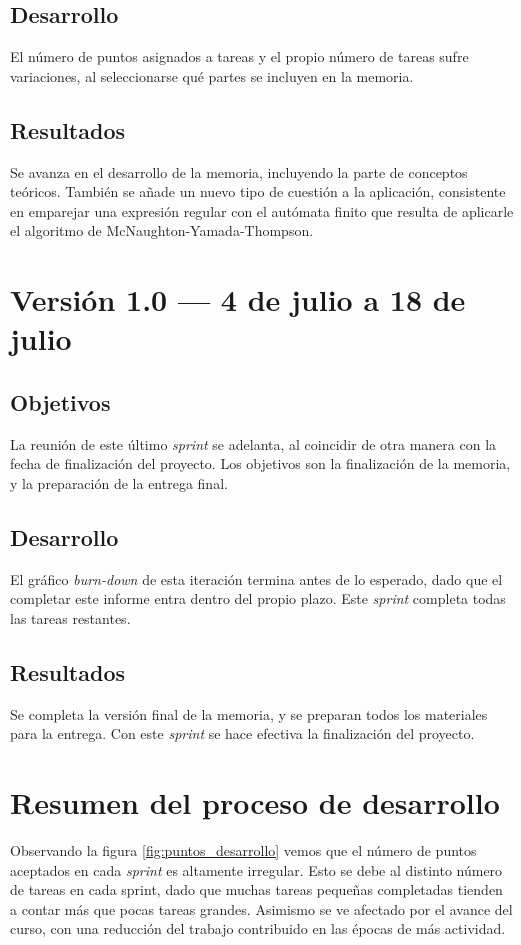 \subsection{Desarrollo}
El número de puntos asignados a tareas y el propio número de tareas sufre variaciones, al seleccionarse qué partes se incluyen en la memoria.


\subsection{Resultados}
Se avanza en el desarrollo de la memoria, incluyendo la parte de conceptos teóricos.
También se añade un nuevo tipo de cuestión a la aplicación, consistente en emparejar una expresión regular con el autómata finito que resulta de aplicarle el algoritmo de McNaughton-Yamada-Thompson.

\section{Versión 1.0 --- 4 de julio a 18 de julio}
\subsection{Objetivos}
La reunión de este último \emph{sprint} se adelanta, al coincidir de otra manera con la fecha de finalización del proyecto.
Los objetivos son la finalización de la memoria, y la preparación de la entrega final.

\subsection{Desarrollo}
El gráfico \emph{burn-down} de esta iteración termina antes de lo esperado, dado que el completar este informe entra dentro del propio plazo.
Este \emph{sprint} completa todas las tareas restantes.


\subsection{Resultados}
Se completa la versión final de la memoria, y se preparan todos los materiales para la entrega.
Con este \emph{sprint} se hace efectiva la finalización del proyecto.

\section{Resumen del proceso de desarrollo}
Observando la figura \ref{fig:puntos_desarrollo} vemos que el número de puntos aceptados en cada \emph{sprint} es altamente irregular.
Esto se debe al distinto número de tareas en cada sprint, dado que muchas tareas pequeñas completadas tienden a contar más que pocas tareas grandes.
Asimismo se ve afectado por el avance del curso, con una reducción del trabajo contribuido en las épocas de más actividad.

